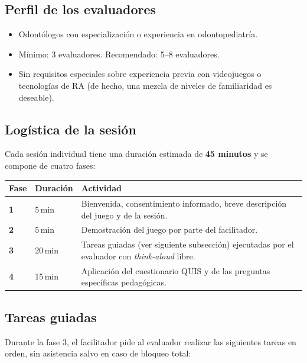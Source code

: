 \documentclass[12pt, a4paper]{article}
\begin{document}
\subsection{Perfil de los evaluadores}

\begin{itemize}[leftmargin=1.5cm, itemsep=3pt]
  \item Odontólogos con especialización o experiencia en odontopediatría.
  \item Mínimo: 3 evaluadores. Recomendado: 5--8 evaluadores.
  \item Sin requisitos especiales sobre experiencia previa con videojuegos
        o tecnologías de RA (de hecho, una mezcla de niveles de familiaridad
        es deseable).
\end{itemize}

\subsection{Logística de la sesión}

Cada sesión individual tiene una duración estimada de \textbf{45 minutos} y
se compone de cuatro fases:

\begin{table}[H]
  \centering
  \renewcommand{\arraystretch}{1.3}
  \begin{tabular}{>{\bfseries}p{1.4cm} p{2.6cm} p{8cm}}
    \toprule
    Fase & Duración & Actividad \\
    \midrule
    1 & 5\,min  & Bienvenida, consentimiento informado, breve descripción
                 del juego y de la sesión. \\
    2 & 5\,min  & Demostración del juego por parte del facilitador. \\
    3 & 20\,min & Tareas guiadas (ver siguiente subsección) ejecutadas por
                  el evaluador con \textit{think-aloud} libre. \\
    4 & 15\,min & Aplicación del cuestionario QUIS y de las preguntas
                  específicas pedagógicas. \\
    \bottomrule
  \end{tabular}
\end{table}

\subsection{Tareas guiadas}

Durante la fase 3, el facilitador pide al evaluador realizar las siguientes
tareas en orden, sin asistencia salvo en caso de bloqueo total:
\end{document}
